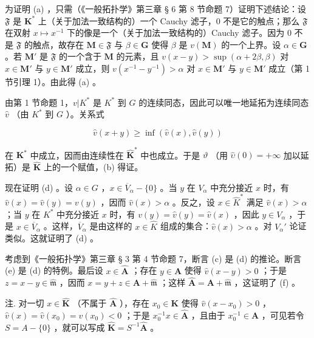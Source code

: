 为证明 (a) ，只需（《一般拓扑学》第三章 § 6 第 8 节命题 7）证明下述结论：设 \(\mathfrak{F}\) 是 \(\mathbf{K}^*\) 上（关于加法一致结构的）一个 Cauchy 滤子，0 不是它的触点；那么 \(\mathfrak{F}\) 在双射 \(x \mapsto x^{-1}\) 下的像是一个（关于加法一致结构的）Cauchy 滤子。因为 0 不是 \(\mathfrak{F}\) 的触点，故存在 \(\mathbf{M} \in \mathfrak{F}\) 与 \(\beta \in \mathbf{G}\) 使得 \(\beta\) 是 \(v(\mathbf{M})\) 的一个上界。设 \(\alpha \in \mathbf{G}\) 。若 \(\mathbf{M}'\) 是 \(\mathfrak{F}\) 的一个含于 \(\mathbf{M}\) 的元素，且 \(v(x - y) > \sup (\alpha + 2\beta, \beta)\) 对 \(x \in \mathbf{M}'\) 与 \(y \in \mathbf{M}'\) 成立，则 \(v(x^{-1} - y^{-1}) > \alpha\) 对 \(x \in \mathbf{M}'\) 与 \(y \in \mathbf{M}'\) 成立（第 1 节引理 1）。由此得 (a) 。

由第 1 节命题 1，\(v|K^*\) 是 \(K^*\) 到 \(G\) 的连续同态，因此可以唯一地延拓为连续同态 \(\hat{v}\) （由 \(K^*\) 到 \(G\) ）。关系式

\[
\hat {v} (x + y) \geqslant \inf (\hat {v} (x), \hat {v} (y))
\]

在 \(\mathbf{K}^*\) 中成立，因而由连续性在 \(\hat{\mathbf{K}}^*\) 中也成立。于是 \(\vartheta\) （用 \(\hat{\upsilon}(0) = +\infty\) 加以延拓）是 \(\hat{\mathbf{K}}\) 上的一个赋值，(b) 得证。

现在证明 (d) 。设 \(\alpha \in G\) ，\(x \in \overline{V}_{\alpha} - \{0\}\) 。当 \(y\) 在 \(V_{\alpha}\) 中充分接近 \(x\) 时，有 \(\hat{v}(x) = \hat{v}(y) = v(y)\) ，因而 \(\hat{v}(x) > \alpha\) 。反之，设 \(x \in \widehat{K}^*\) 满足 \(\hat{v}(x) > \alpha\) ；当 \(y\) 在 \(K^*\) 中充分接近 \(x\) 时，有 \(v(y) = \hat{v}(y) = \hat{v}(x)\) ，因此 \(y \in V_{\alpha}\) ，于是 \(x \in \overline{V}_{\alpha}\) 。这样，\(\overline{V}_{\alpha}\) 是由这样的 \(x \in \widehat{K}\) 组成的集合：\(\hat{v}(x) > \alpha\) 。对 \(V_{\alpha}'\) 论证类似。这就证明了 (d) 。

考虑到《一般拓扑学》第三章 § 3 第 4 节命题 7，断言 (c) 是 (d) 的推论。断言 (e) 是 (d) 的特例。最后设 \(x \in \hat{\mathbf{A}}\) ；存在 \(y \in \mathbf{A}\) 使得 \(\hat{v}(x - y) > 0\) ；于是 \(z = x - y \in \hat{\mathfrak{m}}\) ，因而 \(x = y + z \in \mathbf{A} + \hat{\mathfrak{m}}\) ；这样 \(\hat{\mathbf{A}} = \mathbf{A} + \hat{\mathfrak{m}}\) ，这证明了 (f) 。

注. 对一切 \(x \in \hat{\mathbf{K}}\) （不属于 \(\hat{\mathbf{A}}\) ），存在 \(x_0 \in \mathbf{K}\) 使得 \(\hat{v}(x - x_0) > 0\) ，\(\hat{v}(x) = \hat{v}(x_0) = v(x_0) < 0\) ；于是 \(x_0^{-1}x \in \hat{\mathbf{A}}\) ，且由于 \(x_0^{-1} \in \mathbf{A}\) ，可见若令 \(S = A - \{0\}\) ，就可以写成 \(\hat{\mathbf{K}} = S^{-1}\hat{\mathbf{A}}\) 。

